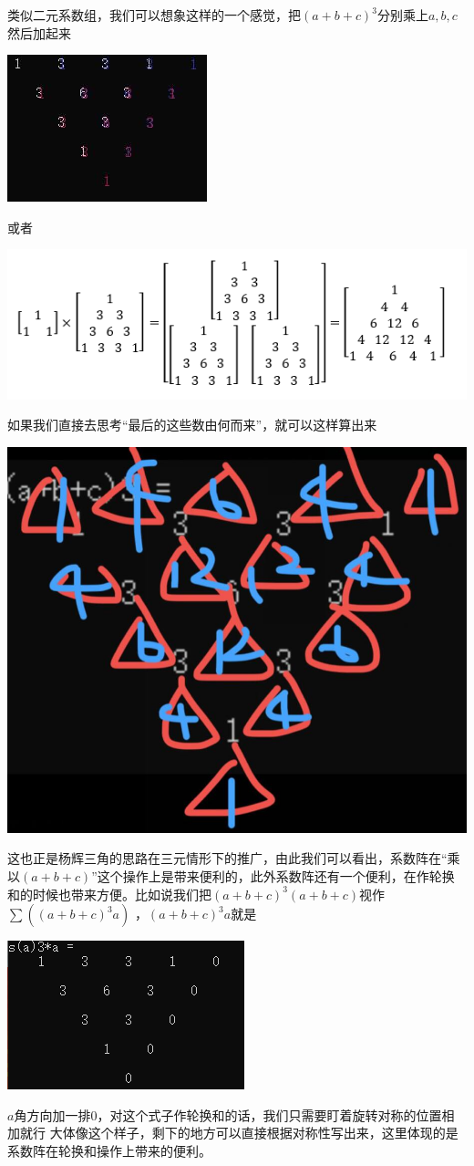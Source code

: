 \documentclass[UTF8]{ctexart}
\begin{document}
类似二元系数组，我们可以想象这样的一个感觉，把$ (a+b+c)^{3} $分别乘上$ a,b,c $然后加起来
\begin{center}
	\includegraphics[width=0.3\linewidth]{050}
\end{center}
或者
\begin{center}
	\includegraphics[width=0.6\linewidth]{060}
\end{center}
如果我们直接去思考“最后的这些数由何而来”，就可以这样算出来
\begin{center}
	\includegraphics[width=0.27\linewidth]{070}
\end{center}
这也正是杨辉三角的思路在三元情形下的推广，由此我们可以看出，系数阵在“乘以$ (a+b+c) $”这个操作上是带来便利的，此外系数阵还有一个便利，在作轮换和的时候也带来方便。比如说我们把$ (a+b+c)^{3}(a+b+c) $视作$ \displaystyle \sum((a+b+c)^{3}a) $ ，$ (a+b+c)^{3}a $就是
\begin{center}
	\includegraphics[width=0.31\linewidth]{080}
\end{center}
$ a $角方向加一排$ 0 $，对这个式子作轮换和的话，我们只需要盯着旋转对称的位置相加就行
大体像这个样子，剩下的地方可以直接根据对称性写出来，这里体现的是系数阵在轮换和操作上带来的便利。
\end{document}
